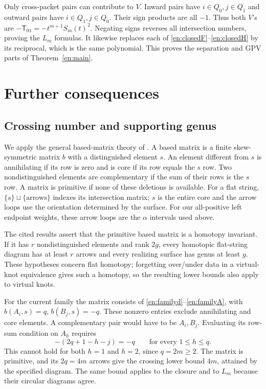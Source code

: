 \documentclass[12pt]{amsart}
\theoremstyle{definition}
\theoremstyle{remark}
\numberwithin{equation}{section}
\newcommand{\TT}{\mathsf T}
\begin{document}
Only cross-packet pairs can contribute to $V$. Inward pairs have
$i\in Q_0,j\in Q_1$ and outward pairs have $i\in Q_1,j\in Q_0$.
Their sign products are all $-1$. Thus both $V$'s are
$-\TT_{01}=-t^{m+1}S_m(t)^2$. Negating signs reverses all intersection
numbers, proving the $L_m$ formulas. It likewise replaces each of
\eqref{en:closedF}--\eqref{en:closedH} by its reciprocal, which is the
same polynomial. This proves the separation and GPV parts of
Theorem~\ref{en:main}.

\section{Further consequences}
\subsection{Crossing number and supporting genus}\label{en:genus}
We apply the general based-matrix theory of
\cite[Lemmas 6.1.1, 6.2.1 and \S6.3]{Turaev}. A based matrix is a
finite skew-symmetric matrix $b$ with a distinguished element $s$.
An element different from $s$ is annihilating if its row is zero and is
core if its row equals the $s$ row. Two nondistinguished elements are
complementary if the sum of their rows is the $s$ row. A matrix is
primitive if none of these deletions is available. For a flat string,
$\{s\}\sqcup\{\text{arrows}\}$ indexes its intersection matrix; $s$ is
the entire core and the arrow loops use the orientation determined by the
surface. For our all-positive left endpoint weights, these arrow loops
are the $\alpha$ intervals used above.

The cited results assert that the primitive based matrix is a homotopy
invariant. If it has $r$ nondistinguished elements and rank $2g$, every
homotopic flat-string diagram has at least $r$ arrows and every realizing
surface has genus at least $g$. These hypotheses concern flat homotopy;
forgetting over/under data in a virtual-knot equivalence gives such a
homotopy, so the resulting lower bounds also apply to virtual knots.

For the current family the matrix consists of
\eqref{en:familyd}--\eqref{en:familyA}, with
$b(A_i,s)=q$, $b(B_j,s)=-q$. These nonzero entries exclude annihilating
and core elements. A complementary pair would have to be $A_i,B_j$.
Evaluating its row-sum condition on $A_h$ requires
\[
-(2q+1-h-j)=-q\qquad\text{for every }1\le h\le q.
\]
This cannot hold for both $h=1$ and $h=2$, since $q=2m\ge2$.
The matrix is primitive, and its $2q=4m$ arrows give the crossing lower
bound $4m$, attained by the specified diagram. The same bound applies
to the closure and to $L_m$ because their circular diagrams agree.
\end{document}
